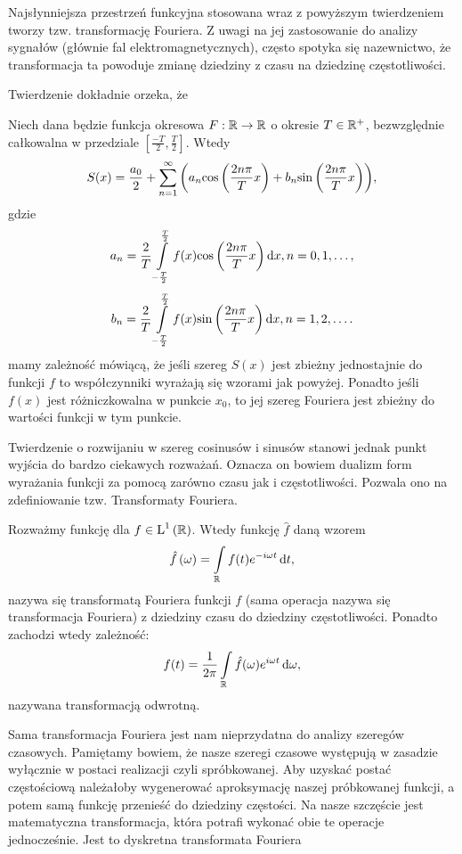 \documentclass[10pt,a4paper]{book}
\begin{document}
Najsłynniejsza przestrzeń funkcyjna stosowana wraz z powyższym twierdzeniem tworzy tzw. transformację Fouriera. Z uwagi na jej zastosowanie do analizy sygnałów (głównie fal elektromagnetycznych), często spotyka się nazewnictwo, że transformacja ta powoduje zmianę dziedziny z czasu na dziedzinę częstotliwości. 

Twierdzenie dokładnie orzeka, że

\begin{theorem}
Niech dana będzie funkcja okresowa $F: \mathbb{R} \to \mathbb{R}$ o okresie $T \in \mathbb{R}^+$, bezwzględnie całkowalna w przedziale $[ \frac{-T}{2}, \frac{T}{2}]$. Wtedy
$$
S(x) = \frac{a_0}{2} + \sum_{n=1}^{\infty} \bracket{a_n \function{\cos}{\frac{2n\pi}{T}x} + b_n \function{\sin}{\frac{2n\pi}{T}x}},
$$
gdzie
$$
a_n = \frac{2}{T} \int_{-\frac{T}{2}}^{\frac{T}{2}} f(x) \function{\cos}{\frac{2 n \pi}{T} x} \dt[x], n = 0,1,\ldots ,
$$
$$
b_n = \frac{2}{T} \int_{-\frac{T}{2}}^{\frac{T}{2}} f(x) \function{\sin}{\frac{2 n \pi}{T} x} \dt[x], n = 1,2,\ldots.
$$
mamy zależność mówiącą, że jeśli szereg $S(x)$ jest zbieżny jednostajnie do funkcji $f$ to współczynniki wyrażają się wzorami jak powyżej. Ponadto jeśli $f(x) $ jest różniczkowalna w punkcie $x_0$, to jej szereg Fouriera jest zbieżny do wartości funkcji w tym punkcie.
\end{theorem}

Twierdzenie o rozwijaniu w szereg cosinusów i sinusów stanowi jednak punkt wyjścia do bardzo ciekawych rozważań. Oznacza on bowiem dualizm form wyrażania funkcji za pomocą zarówno czasu jak i częstotliwości. Pozwala ono na zdefiniowanie tzw. Transformaty Fouriera.

\begin{definition}
Rozważmy funkcję dla $f \in \Lp{1}{\setR}$. Wtedy funkcję $\hat{f}$ daną wzorem
$$
\function{\hat{f}}{\omega} = \int_{\setR } f(t) e^{-i\omega t} \dt [t],
$$
nazywa się transformatą Fouriera funkcji $f$ (sama operacja nazywa się transformacja Fouriera) z dziedziny czasu do dziedziny częstotliwości. 
Ponadto zachodzi wtedy zależność:
$$
f(t) = \frac{1}{2\pi} \int_{\setR } \hat{f}(\omega) e^{i\omega t}  \dt[\omega],
$$
nazywana transformacją odwrotną.
\end{definition}

Sama transformacja Fouriera jest nam nieprzydatna do analizy szeregów czasowych. Pamiętamy bowiem, że nasze szeregi czasowe występują w zasadzie wyłącznie w postaci realizacji czyli spróbkowanej. Aby uzyskać postać częstościową należałoby wygenerować aproksymację naszej próbkowanej funkcji, a potem samą funkcję przenieść do dziedziny częstości. Na nasze szczęście jest matematyczna transformacja, która potrafi wykonać obie te operacje jednocześnie. Jest to dyskretna transformata Fouriera
\end{document}
